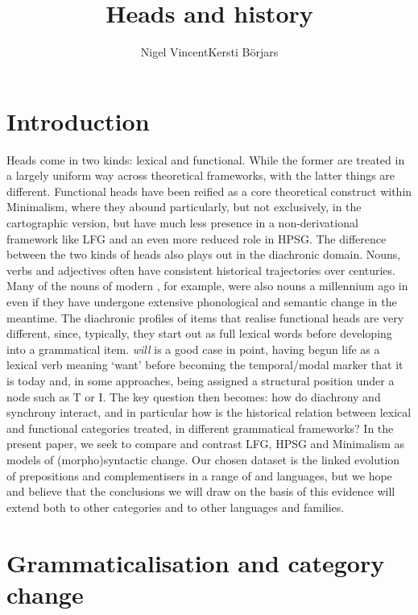\documentclass[output=paper]{langsci/langscibook}
\author{Nigel Vincent\affiliation{The University of Manchester}\lastand Kersti
Börjars\affiliation{St Catherine's College, University of Oxford}}
\title{Heads and history}
\begin{document}
\glsresetall

\section{Introduction}

Heads come in two kinds: lexical and functional. While the former are treated
in a largely uniform way across theoretical frameworks, with the latter things
are different. Functional heads have been reified as a core theoretical
construct within Minimalism, where they abound particularly, but not
exclusively, in the cartographic version, but have much less presence in a
non-derivational framework like \gls{LFG} and an even more reduced role in
\gls{HPSG}. The difference between the two kinds of heads also plays out in the
diachronic domain. Nouns, verbs and adjectives often have consistent historical
trajectories over centuries. Many of the nouns of modern , for example,
were also nouns a millennium ago in  even if they have undergone
extensive phonological and semantic change in the meantime. The diachronic
profiles of items that realise functional heads are very
different, since, typically, they start out as full lexical words before
developing into a grammatical item.  \emph{will} is a good case in
point, having begun life as a lexical verb meaning \enquote*{want} before
becoming the temporal/modal marker that it is today and, in some approaches,
being assigned a structural position under a node such as T or I. The key
question then becomes: how do diachrony and synchrony interact, and in
particular how is the historical relation between lexical and functional
categories treated, in different grammatical frameworks?  In the present paper,
we seek to compare and contrast \gls{LFG}, \gls{HPSG} and Minimalism as models of (morpho)syntactic change. Our
chosen dataset is the linked evolution of prepositions and complementisers in a
range of  and  languages, but we hope and believe
that the conclusions we will draw on the basis of this evidence will extend
both to other categories and to other languages and
families.

\section{Grammaticalisation and category change}
\end{document}
